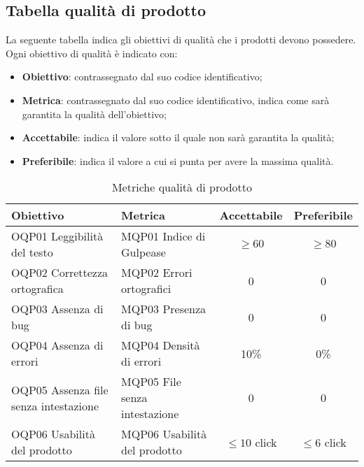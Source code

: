 \documentclass[../piano_di_qualifica.tex]{subfiles}
\begin{document}
\subsection{Tabella qualità di prodotto}
La seguente tabella indica gli obiettivi di qualità che i prodotti devono possedere.\\
Ogni obiettivo di qualità è indicato con:
\smallbreak
\begin{itemize}
	\item \textbf{Obiettivo}: contrassegnato dal suo codice identificativo;
	\item \textbf{Metrica}: contrassegnato dal suo codice identificativo, indica come sarà garantita la qualità dell'obiettivo;
	\item \textbf{Accettabile}: indica il valore sotto il quale non sarà garantita la qualità;
	\item \textbf{Preferibile}: indica il valore a cui si punta per avere la massima qualità.
\end{itemize}

\begin{table}[!ht]
	\centering
	\begin{tabular}{|l|l|c|c|}
		\hline
		\rowcolor{lightgray}
		\textbf{Obiettivo}                    & \textbf{Metrica}              & \textbf{Accettabile} & \textbf{Preferibile} \\
		\hline
		OQP01 Leggibilità del testo           & MQP01 Indice di Gulpease      & \(\ge 60\)           & \(\ge 80\)           \\
		\hline
		OQP02 Correttezza ortografica         & MQP02 Errori ortografici      & 0                    & 0                    \\
		\hline
		OQP03 Assenza di bug                  & MQP03 Presenza di bug         & 0                    & 0                    \\
		\hline
		OQP04 Assenza di errori               & MQP04 Densità di errori       & 10\%                 & 0\%                  \\
		\hline
		OQP05 Assenza file senza intestazione & MQP05 File senza intestazione & 0                    & 0                    \\
		\hline
		OQP06 Usabilità del prodotto          & MQP06 Usabilità del prodotto  & \(\leq10\) click     & \(\leq6\) click      \\
		\hline
	\end{tabular}
	\caption{Metriche qualità di prodotto}
\end{table}
\end{document}
